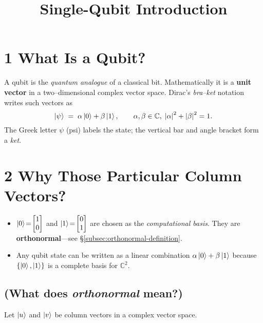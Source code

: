 \documentclass[12pt]{article}
\title{\bfseries Single-Qubit Introduction}
\author{}
\date{}
\begin{document}
\maketitle
\vspace{-2em}

\section*{1 \quad What Is a Qubit?}
A qubit is the \emph{quantum analogue} of a classical bit.  Mathematically
it is a \textbf{unit vector} in a two–dimensional complex vector space.
Dirac’s \textit{bra–ket} notation writes such vectors as
\[
   \ket{\psi} \;=\; \alpha\ket{0}+\beta\ket{1},
   \qquad
   \alpha,\beta\in\mathbb{C},\;
   \abs{\alpha}^{2}+\abs{\beta}^{2}=1.
\]
The Greek letter $\psi$ (psi) labels the state; the vertical bar and
angle bracket form a \emph{ket}.

\section*{2 \quad Why Those Particular Column Vectors?}

\begin{itemize}
  \item $\ket{0}\!=\!\begin{bmatrix}1\\0\end{bmatrix}$ and
        $\ket{1}\!=\!\begin{bmatrix}0\\1\end{bmatrix}$ are chosen as the
        \emph{computational basis}.  They are
        \textbf{orthonormal}—see \S\ref{subsec:orthonormal-definition}.
  \item Any qubit state can be written as a linear combination
        $\alpha\ket{0}+\beta\ket{1}$ because $\{\ket{0},\ket{1}\}$ is a
        complete basis for $\mathbb{C}^{2}$.
\end{itemize}

\subsection*{(What does \textit{orthonormal} mean?)}%
\label{subsec:orthonormal-definition}

Let $\ket{u}$ and \(\ket{v}\) be column vectors in a complex vector
space.
\end{document}
